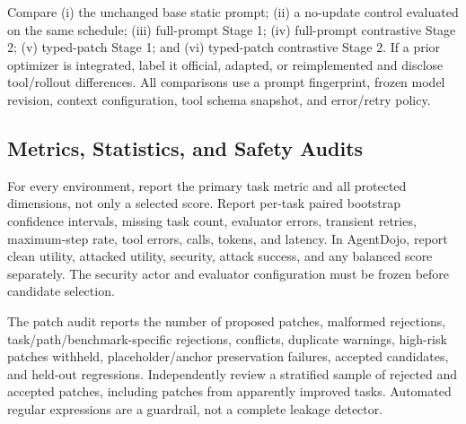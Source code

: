 \documentclass[10pt]{article}
\begin{document}
Compare (i) the unchanged base static prompt; (ii) a no-update control evaluated on the same schedule; (iii) full-prompt Stage 1; (iv) full-prompt contrastive Stage 2; (v) typed-patch Stage 1; and (vi) typed-patch contrastive Stage 2. If a prior optimizer is integrated, label it official, adapted, or reimplemented and disclose tool/rollout differences. All comparisons use a prompt fingerprint, frozen model revision, context configuration, tool schema snapshot, and error/retry policy.

\begin{table}[t]
\centering
\caption{Final reporting template. A row is eligible for the main paper only after a real development acceptance decision and a disjoint locked test run.}
\label{tab:main}
\small
{}
\end{table}

\subsection{Metrics, Statistics, and Safety Audits}
For every environment, report the primary task metric and all protected dimensions, not only a selected score. Report per-task paired bootstrap confidence intervals, missing task count, evaluator errors, transient retries, maximum-step rate, tool errors, calls, tokens, and latency. In AgentDojo, report clean utility, attacked utility, security, attack success, and any balanced score separately. The security actor and evaluator configuration must be frozen before candidate selection.

The patch audit reports the number of proposed patches, malformed rejections, task/path/benchmark-specific rejections, conflicts, duplicate warnings, high-risk patches withheld, placeholder/anchor preservation failures, accepted candidates, and held-out regressions. Independently review a stratified sample of rejected and accepted patches, including patches from apparently improved tasks. Automated regular expressions are a guardrail, not a complete leakage detector.
\end{document}
